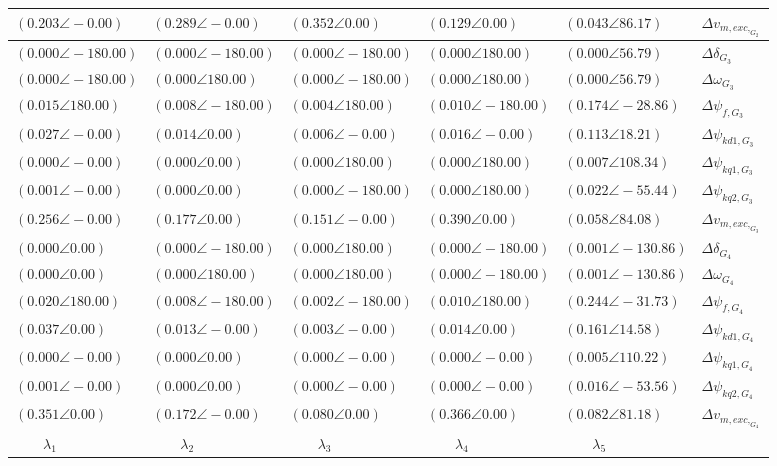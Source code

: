 \begin{tabular}{lllll|l}
$\mathbf{(0.203 \angle -0.00)}$	& $\mathbf{(0.289 \angle -0.00)}$	& $\mathbf{(0.352 \angle 0.00)}$	& $\mathbf{(0.129 \angle 0.00)}$	& $(0.043 \angle 86.17)$	& $\Delta v_{m,exc,_{G_2}}$ \\ 
 \hline 
$(0.000 \angle -180.00)$	& $(0.000 \angle -180.00)$	& $(0.000 \angle -180.00)$	& $(0.000 \angle 180.00)$	& $(0.000 \angle 56.79)$	& $\Delta\delta_{G_3}$ \\ 
$(0.000 \angle -180.00)$	& $(0.000 \angle 180.00)$	& $(0.000 \angle -180.00)$	& $(0.000 \angle 180.00)$	& $(0.000 \angle 56.79)$	& $\Delta\omega_{G_3}$ \\ 
$(0.015 \angle 180.00)$	& $(0.008 \angle -180.00)$	& $(0.004 \angle 180.00)$	& $(0.010 \angle -180.00)$	& $\mathbf{(0.174 \angle -28.86)}$	& $\Delta \psi_{f,G_3}$ \\ 
$(0.027 \angle -0.00)$	& $(0.014 \angle 0.00)$	& $(0.006 \angle -0.00)$	& $(0.016 \angle -0.00)$	& $\mathbf{(0.113 \angle 18.21)}$	& $\Delta \psi_{kd1,G_3}$ \\ 
$(0.000 \angle -0.00)$	& $(0.000 \angle 0.00)$	& $(0.000 \angle 180.00)$	& $(0.000 \angle 180.00)$	& $(0.007 \angle 108.34)$	& $\Delta \psi_{kq1,G_3}$ \\ 
$(0.001 \angle -0.00)$	& $(0.000 \angle 0.00)$	& $(0.000 \angle -180.00)$	& $(0.000 \angle 180.00)$	& $(0.022 \angle -55.44)$	& $\Delta \psi_{kq2,G_3}$ \\ 
$\mathbf{(0.256 \angle -0.00)}$	& $\mathbf{(0.177 \angle 0.00)}$	& $\mathbf{(0.151 \angle -0.00)}$	& $\mathbf{(0.390 \angle 0.00)}$	& $\mathbf{(0.058 \angle 84.08)}$	& $\Delta v_{m,exc,_{G_3}}$ \\ 
 \hline 
$(0.000 \angle 0.00)$	& $(0.000 \angle -180.00)$	& $(0.000 \angle 180.00)$	& $(0.000 \angle -180.00)$	& $(0.001 \angle -130.86)$	& $\Delta\delta_{G_4}$ \\ 
$(0.000 \angle 0.00)$	& $(0.000 \angle 180.00)$	& $(0.000 \angle 180.00)$	& $(0.000 \angle -180.00)$	& $(0.001 \angle -130.86)$	& $\Delta\omega_{G_4}$ \\ 
$(0.020 \angle 180.00)$	& $(0.008 \angle -180.00)$	& $(0.002 \angle -180.00)$	& $(0.010 \angle 180.00)$	& $\mathbf{(0.244 \angle -31.73)}$	& $\Delta \psi_{f,G_4}$ \\ 
$(0.037 \angle 0.00)$	& $(0.013 \angle -0.00)$	& $(0.003 \angle -0.00)$	& $(0.014 \angle 0.00)$	& $\mathbf{(0.161 \angle 14.58)}$	& $\Delta \psi_{kd1,G_4}$ \\ 
$(0.000 \angle -0.00)$	& $(0.000 \angle 0.00)$	& $(0.000 \angle -0.00)$	& $(0.000 \angle -0.00)$	& $(0.005 \angle 110.22)$	& $\Delta \psi_{kq1,G_4}$ \\ 
$(0.001 \angle -0.00)$	& $(0.000 \angle 0.00)$	& $(0.000 \angle -0.00)$	& $(0.000 \angle -0.00)$	& $(0.016 \angle -53.56)$	& $\Delta \psi_{kq2,G_4}$ \\ 
$\mathbf{(0.351 \angle 0.00)}$	& $\mathbf{(0.172 \angle -0.00)}$	& $\mathbf{(0.080 \angle 0.00)}$	& $\mathbf{(0.366 \angle 0.00)}$	& $\mathbf{(0.082 \angle 81.18)}$	& $\Delta v_{m,exc,_{G_4}}$ \\ 
 \hline 
\hline 
$\qquad\lambda_{1}$	&$\qquad\lambda_{2}$	&$\qquad\lambda_{3}$	&$\qquad\lambda_{4}$	&$\qquad\lambda_{5}$	&
\end{tabular}

